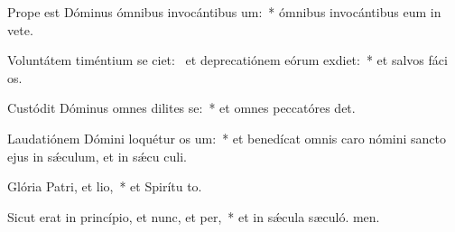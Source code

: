 \item Prope est Dóminus ómnibus invocántibus um:~* ómnibus invocántibus eum in vete.
\item Voluntátem timéntium se ciet:~\pscross{} et deprecatiónem eórum exdiet:~* et salvos fáci os.
\item Custódit Dóminus omnes dilites se:~* et omnes peccatóres det.
\item Laudatiónem Dómini loquétur os um:~* et benedícat omnis caro nómini sancto ejus in sǽculum, et in sǽcu culi.
\item Glória Patri, et lio,~* et Spirítu to.
\item Sicut erat in princípio, et nunc, et per,~* et in sǽcula sæculó. men.
